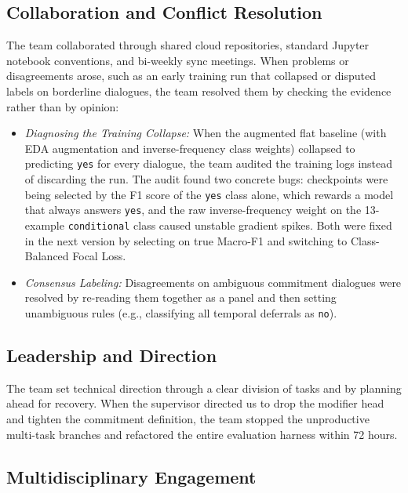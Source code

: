 \subsection{Collaboration and Conflict Resolution}
\label{sec:collaboration}

The team collaborated through shared cloud repositories, standard Jupyter notebook conventions, and bi-weekly sync meetings. When problems or disagreements arose, such as an early training run that collapsed or disputed labels on borderline dialogues, the team resolved them by checking the evidence rather than by opinion:
\begin{itemize}
  \item \textit{Diagnosing the Training Collapse:} When the augmented flat baseline (with EDA augmentation and inverse-frequency class weights) collapsed to predicting \texttt{yes} for every dialogue, the team audited the training logs instead of discarding the run. The audit found two concrete bugs: checkpoints were being selected by the F1 score of the \texttt{yes} class alone, which rewards a model that always answers \texttt{yes}, and the raw inverse-frequency weight on the 13-example \texttt{conditional} class caused unstable gradient spikes. Both were fixed in the next version by selecting on true Macro-F1 and switching to Class-Balanced Focal Loss.
  \item \textit{Consensus Labeling:} Disagreements on ambiguous commitment dialogues were resolved by re-reading them together as a panel and then setting unambiguous rules (e.g., classifying all temporal deferrals as \texttt{no}).
\end{itemize}

\subsection{Leadership and Direction}
\label{sec:leadership}

The team set technical direction through a clear division of tasks and by planning ahead for recovery. When the supervisor directed us to drop the modifier head and tighten the commitment definition, the team stopped the unproductive multi-task branches and refactored the entire evaluation harness within 72 hours.

\subsection{Multidisciplinary Engagement}
\label{sec:multidisciplinary}

